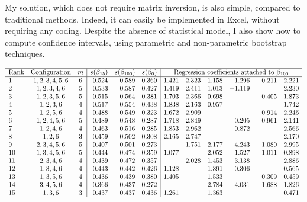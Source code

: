 \documentclass[oneside,10pt]{book}
\begin{document}
My solution, which does not require matrix inversion, is also simple, compared to traditional methods. Indeed, it can easily be implemented in Excel, without requiring any coding. Despite the absence of statistical model, I also show how to compute confidence intervals, using parametric and non-parametric bootstrap techniques.




\begin{table}%
\footnotesize
\[
\begin{array}{lcc|rrr|rrrrrr}
\hline
\text{Rank}	&	\text{Configuration}	&	m	&	s(\beta_{15}) & s(\beta_{100}) & s(\beta_0)	&	\multicolumn{6}{c}{\text{Regression coefficients attached to } \beta_{100}}		\\
\hline
1	&	1,2,3,4,5,6	&	6	&	0.524	&	0.589	&	0.360	&	1.421	&	2.323	&	1.158	&	-1.296	&	0.211	&	2.221	\\
2	&	1,2,3,4,6	&	5	&	0.533	&	0.587	&	0.427	&	1.419	&	2.411	&	1.013	&	-1.119	&		&	2.230	\\
3	&	1,2,3,5,6	&	5	&	0.515	&	0.564	&	0.381	&	1.703	&	2.366	&	0.698	&		&	-0.405	&	1.873	\\
4	&	1,2,3,6	&	4	&	0.517	&	0.554	&	0.438	&	1.838	&	2.163	&	0.957	&		&		&	1.742	\\
5	&	1,2,5,6	&	4	&	0.488	&	0.549	&	0.323	&	1.672	&	2.909	&		&		&	-0.914	&	2.246	\\
6	&	1,2,4,5,6	&	5	&	0.489	&	0.548	&	0.287	&	1.718	&	2.849	&		&	0.205	&	-0.961	&	2.141	\\
7	&	1,2,4,6	&	4	&	0.463	&	0.516	&	0.285	&	1.853	&	2.962	&		&	-0.872	&		&	2.566	\\
8	&	1,2,6	&	3	&	0.459	&	0.502	&	0.308	&	2.165	&	2.747	&		&		&		&	2.170	\\
9	&	2,3,4,5,6	&	5	&	0.407	&	0.501	&	0.273	&		&	1.751	&	2.177	&	-4.243	&	1.080	&	2.995	\\
10	&	1,3,4,5,6	&	5	&	0.444	&	0.474	&	0.359	&	1.077	&		&	2.052	&	-1.527	&	1.011	&	0.898	\\
11	&	2,3,4,6	&	4	&	0.439	&	0.472	&	0.357	&		&	2.028	&	1.453	&	-3.138	&		&	2.886	\\
12	&	1,3,4,6	&	4	&	0.443	&	0.442	&	0.426	&	1.128	&		&	1.391	&	-0.306	&		&	0.565	\\
13	&	1,3,5,6	&	4	&	0.436	&	0.439	&	0.380	&	1.405	&		&	1.533	&		&	0.309	&	0.459	\\
14	&	3,4,5,6	&	4	&	0.366	&	0.437	&	0.272	&		&		&	2.784	&	-4.031	&	1.688	&	1.826	\\
15	&	1,3,6	&	3	&	0.437	&	0.437	&	0.436	&	1.261	&		&	1.363	&		&		&	0.471	\\

\end{array}\]
\end{table}
\end{document}
